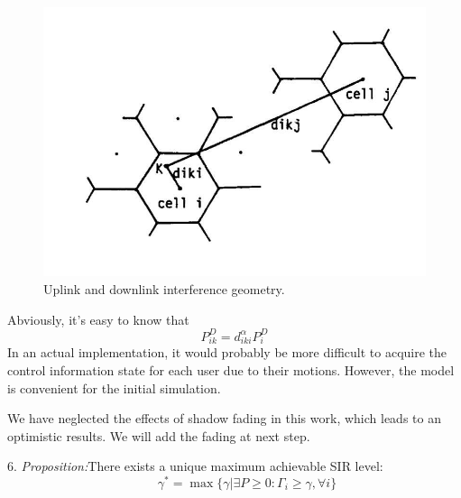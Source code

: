 \documentclass[conference]{IEEEtran}
\begin{document}
\begin{figure}[th]
	\centering
	\includegraphics[scale=0.3]{t}
	\caption{Uplink and downlink interference geometry.}
	\label{fig:t}
\end{figure}

Abviously, it's easy to know that
\begin{equation}
P^{D}_{ik} = d^\alpha_{iki}P_i^D
\end{equation}
In an actual implementation, it would probably be more difficult to acquire the control information state for each user due to their motions. However, the model is convenient for the initial simulation.

We have neglected the effects of shadow fading in this work, which leads to an optimistic results. We will add the fading at next step.

6. \textit{Proposition:}There exists a unique maximum achievable SIR level:
\begin{equation*}
\qquad \gamma^{*} = \max\{\gamma | \exists P\geq 0 : \Gamma_i \geq \gamma, \forall i \}
\end{equation*}

\end{document}
